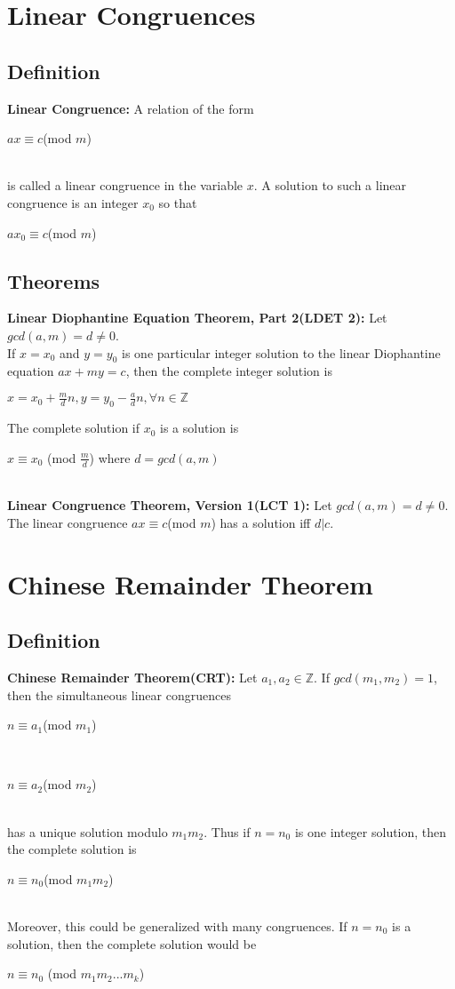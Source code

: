 \documentclass[12pt]{report}
\begin{document}
	\section{Linear Congruences}
		\subsection{Definition}
			\textbf{Linear Congruence:} A relation of the form\\
			\centerline{$ax \equiv c$(mod $m$)}\\
			is called a linear congruence in the variable $x$. A solution to such a linear congruence is an integer $x_0$ so that \\
			\centerline{$ax_0 \equiv c$(mod $m$)}
		\subsection{Theorems}
			\textbf{Linear Diophantine Equation Theorem, Part 2(LDET 2):} Let $gcd(a,m)=d\neq 0$. \\
			If $x = x_0$ and $y = y_0$ is one particular integer solution to the linear Diophantine equation $ax + my = c$, then the complete integer solution is \\
			\centerline{$x = x_0 + \frac{m}{d}n, y=y_0 - \frac{a}{d}n, \forall n \in \mathbb{Z}$}
			The complete solution if $x_0$ is a solution is \\
			\centerline{$x \equiv x_0$ (mod $\frac{m}{d}$) where $d = gcd(a,m)$}\\
			\textbf{Linear Congruence Theorem, Version 1(LCT 1):} Let $gcd(a,m) = d \neq 0$.\\
			The linear congruence $ax \equiv c$(mod $m$) has a solution iff $d|c$.\\
	\section{Chinese Remainder Theorem}
		\subsection{Definition}
			\textbf{Chinese Remainder Theorem(CRT):} Let $a_1, a_2 \in \mathbb{Z}$. If $gcd(m_1, m_2)=1$, then the simultaneous linear congruences \\
			\centerline{$n \equiv a_1$(mod $m_1$)}\\
			\centerline{$n \equiv a_2$(mod $m_2$)}\\
			has a unique solution modulo $m_1m_2$. Thus if $n = n_0$ is one integer solution, then the complete solution is \\
			\centerline{$n \equiv n_0$(mod $m_1m_2$)}\\
			Moreover, this could be generalized with many congruences. If $n = n_0$ is a solution, then the complete solution would be \\
			\centerline{$n \equiv n_0$ (mod $m_1m_2...m_k$)}
			
\end{document}
